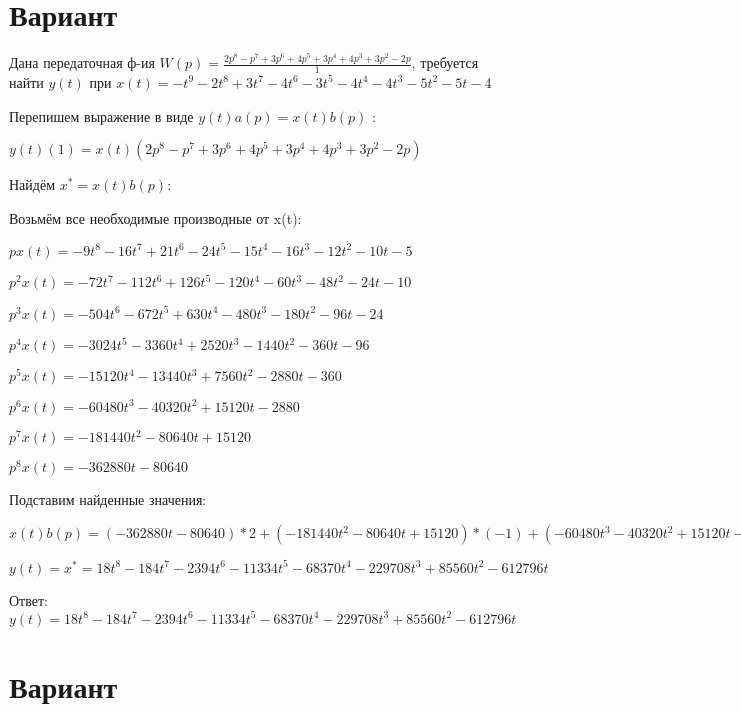 \documentclass{article}
\begin{document}
{{{{{{\section{Вариант}

Дана передаточная ф-ия $W(p)=\frac{2p^{8}-p^{7}+3p^{6}+4p^{5}+3p^{4}+4p^{3}+3p^{2}-2p}{1}$, требуется найти $y(t)$ при $x(t)=-t^{9}-2t^{8}+3t^{7}-4t^{6}-3t^{5}-4t^{4}-4t^{3}-5t^{2}-5t-4$

Перепишем выражение в виде $y(t)a(p)=x(t)b(p)$ :

$y(t)(1)=x(t)(2p^{8}-p^{7}+3p^{6}+4p^{5}+3p^{4}+4p^{3}+3p^{2}-2p)$

Найдём $x^*=x(t)b(p)$:

Возьмём все необходимые производные от x(t):

$px(t)=-9t^{8}-16t^{7}+21t^{6}-24t^{5}-15t^{4}-16t^{3}-12t^{2}-10t-5$

$p^2x(t)=-72t^{7}-112t^{6}+126t^{5}-120t^{4}-60t^{3}-48t^{2}-24t-10$

$p^3x(t)=-504t^{6}-672t^{5}+630t^{4}-480t^{3}-180t^{2}-96t-24$

$p^4x(t)=-3024t^{5}-3360t^{4}+2520t^{3}-1440t^{2}-360t-96$

$p^5x(t)=-15120t^{4}-13440t^{3}+7560t^{2}-2880t-360$

$p^6x(t)=-60480t^{3}-40320t^{2}+15120t-2880$

$p^7x(t)=-181440t^{2}-80640t+15120$

$p^8x(t)=-362880t-80640$

Подставим найденные значения:

$x(t)b(p) = (-362880t-80640)*2+(-181440t^{2}-80640t+15120)*(-1)+(-60480t^{3}-40320t^{2}+15120t-2880)*3+(-15120t^{4}-13440t^{3}+7560t^{2}-2880t-360)*4+(-3024t^{5}-3360t^{4}+2520t^{3}-1440t^{2}-360t-96)*3+(-504t^{6}-672t^{5}+630t^{4}-480t^{3}-180t^{2}-96t-24)*4+(-72t^{7}-112t^{6}+126t^{5}-120t^{4}-60t^{3}-48t^{2}-24t-10)*3+(-9t^{8}-16t^{7}+21t^{6}-24t^{5}-15t^{4}-16t^{3}-12t^{2}-10t-5)*(-2)+=18t^{8}-184t^{7}-2394t^{6}-11334t^{5}-68370t^{4}-229708t^{3}+85560t^{2}-612796t$





$y(t)=x^*=18t^{8}-184t^{7}-2394t^{6}-11334t^{5}-68370t^{4}-229708t^{3}+85560t^{2}-612796t$

Ответ: $y(t) = 18t^{8}-184t^{7}-2394t^{6}-11334t^{5}-68370t^{4}-229708t^{3}+85560t^{2}-612796t$

\section{Вариант}

}}}}}}
\end{document}
